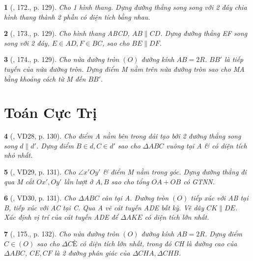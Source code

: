 \documentclass{article}
\newtheorem{baitoan}{}
\begin{document}
\begin{baitoan}[\cite{Binh_Toan_9_tap_1}, 172., p. 129]
	Cho 1 hình thang. Dựng đường thẳng song song với 2 đáy chia hình thang thành 2 phần có diện tích bằng nhau.
\end{baitoan}

\begin{baitoan}[\cite{Binh_Toan_9_tap_1}, 173., p. 129]
	Cho hình thang ABCD, $AB\parallel CD$. Dựng đường thẳng EF song song với 2 đáy, $E\in AD,F\in BC$, sao cho $BE\parallel DF$.
\end{baitoan}

\begin{baitoan}[\cite{Binh_Toan_9_tap_1}, 174., p. 129]
	Cho nửa đường tròn $(O)$ đường kính $AB = 2R$. $BB'$ là tiếp tuyến của nửa đường tròn. Dựng điểm M nằm trên nửa đường tròn sao cho MA bằng khoảng cách từ M đến $BB'$.
\end{baitoan}


\section{Toán Cực Trị}

\begin{baitoan}[\cite{Binh_Toan_9_tap_1}, VD28, p. 130]
	Cho điểm A nằm bên trong dải tạo bởi 2 đường thẳng song song $d\parallel d'$. Dựng điểm $B\in d,C\in d'$ sao cho $\Delta ABC$ vuông tại A \& có diện tích nhỏ nhất.
\end{baitoan}

\begin{baitoan}[\cite{Binh_Toan_9_tap_1}, VD29, p. 131]
	Cho $\angle{x'Oy'}$ \& điểm M nằm trong góc. Dựng đường thẳng đi qua M cắt $Ox',Oy'$ lần lượt ở $A,B$ sao cho tổng $OA + OB$ có {\rm GTNN}.
\end{baitoan}

\begin{baitoan}[\cite{Binh_Toan_9_tap_1}, VD30, p. 131]
	Cho $\Delta ABC$ cân tại A. Đường tròn $(O)$ tiếp xúc với AB tại B, tiếp xúc với AC tại C. Qua A vẽ cát tuyến ADE bất kỳ. Vẽ dây $CK\parallel DE$. Xác định vị trí của cát tuyến ADE để $\Delta AKE$ có diện tích lớn nhất.
\end{baitoan}

\begin{baitoan}[\cite{Binh_Toan_9_tap_1}, 175., p. 132]
	Cho nửa đường tròn $(O)$ đường kính $AB = 2R$. Dựng điểm $C\in(O)$ sao cho $\Delta CÈ$ có diện tích lớn nhất, trong đó CH là đường cao của $\Delta ABC$, $CE,CF$ là 2 đường phân giác của $\Delta CHA,\Delta CHB$.
\end{baitoan}
\end{document}
